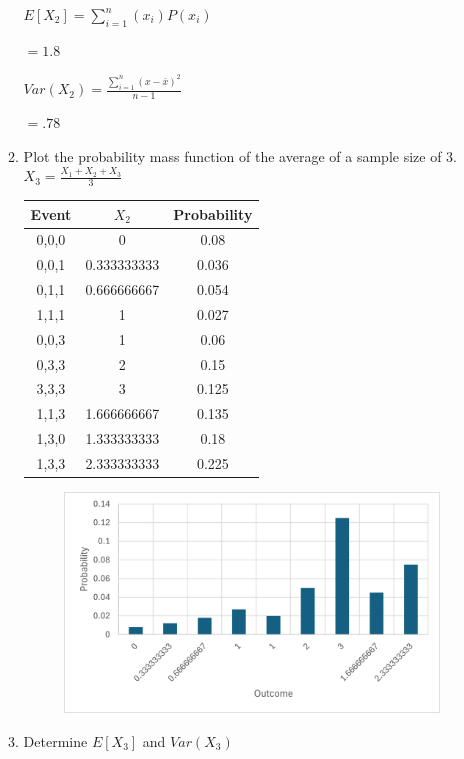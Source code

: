 \documentclass{article}
\begin{document}
\begin{enumerate}
\begin{enumerate}
        $\displaystyle E[X_2] = \sum_{i=1}^n{(x_i)P(x_i)}$

        $= 1.8$

        $\displaystyle Var(X_2) = \frac{\sum_{i=1}^n{(x - \bar{x})^2}}{n-1}$

        $= .78$

        \item Plot the probability mass function of the average of a sample size of 3. $X_3 = \frac{X_1+X_2+X_3}{3}$
        
        \begin{tabular}{|c|c|c|}
            \hline
            \textbf{Event} & \bf{$X_2$} & \textbf{Probability} \\
            \hline
            0,0,0 & 0 & 0.08 \\
            0,0,1 & 0.333333333 & 0.036 \\
            0,1,1 & 0.666666667 & 0.054 \\
            1,1,1 & 1 & 0.027 \\
            0,0,3 & 1 & 0.06 \\
            0,3,3 & 2 & 0.15 \\
            3,3,3 & 3 & 0.125 \\
            1,1,3 & 1.666666667 & 0.135 \\
            1,3,0 & 1.333333333 & 0.18 \\
            1,3,3 & 2.333333333 & 0.225 \\
            \hline
            \end{tabular}
        
        \begin{figure}[!htbp]
                \centerline{\includegraphics[keepaspectratio]{Picture/Picture2.png}}
                \label{fig1}
            \end{figure}
        \item Determine $E[X_3]$ and $Var(X_3)$
        

\end{enumerate}
\end{enumerate}
\end{document}
